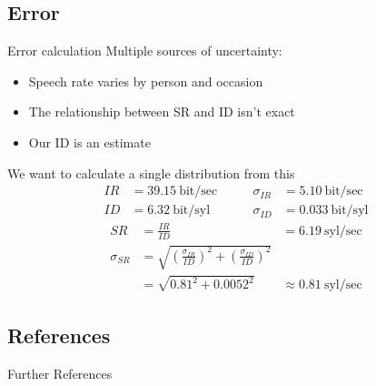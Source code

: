 \documentclass{beamer}
\begin{document}
\subsection{Error}
\begin{frame}{Error calculation}
Multiple sources of uncertainty:
\vspace{-1em}
\begin{itemize}
\item Speech rate varies by person and occasion
\item The relationship between SR and ID isn't exact
\item Our ID is an estimate
\end{itemize}
\vspace{-1em}
We want to calculate a single distribution from this
\vspace*{-0.5em}
\begin{align*}
IR &= 39.15~\text{bit/sec} \quad & \quad \sigma_{IR} &= 5.10~\text{bit/sec} \\
ID &= 6.32~\text{bit/syl} \quad & \quad \sigma_{ID} &= 0.033~\text{bit/syl}
\end{align*}
\vspace*{-2em}
\begin{align*}
SR &= \frac{IR}{ID} &= 6.19~\text{syl/sec} \\
\sigma_{SR} &= \sqrt{\left(\frac{\sigma_{IR}}{ID}\right)^2 + \left(\frac{\sigma_{ID}}{ID}\right)^2}\\
&= \sqrt{0.81^2 + 0.0052^2} &\approx{} 0.81~\text{syl/sec}
\end{align*}
\end{frame}

\subsection{References}
\begin{frame}{Further References}
\small
\printbibliography[keyword={secondary},heading=none]
\end{frame}
\end{document}
